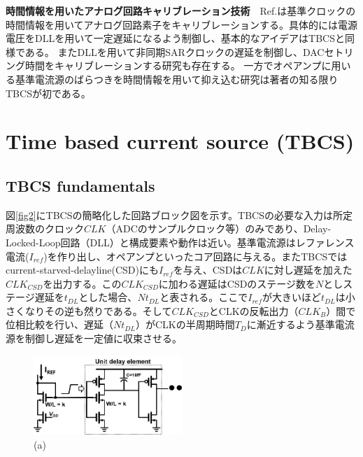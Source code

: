 \documentclass[letterpaper, 10 pt, conference]{ieeeconf}  %
\begin{document}
\textbf{時間情報を用いたアナログ回路キャリブレーション技術}　Ref.\cite{zhu}は基準クロックの時間情報を用いてアナログ回路素子をキャリブレーションする。具体的には電源電圧をDLLを用いて一定遅延になるよう制御し、基本的なアイデアはTBCSと同様である。
またDLLを用いて非同期SARクロックの遅延を制御し、DACセトリング時間をキャリブレーションする研究も存在する\cite{kapusta201314b,tompson}。
一方でオペアンプに用いる基準電流源のばらつきを時間情報を用いて抑え込む研究は著者の知る限りTBCSが初である。

\section{Time based current source (TBCS)}
\subsection{TBCS fundamentals}

図\ref{fig2}にTBCSの簡略化した回路ブロック図を示す。TBCSの必要な入力は所定周波数のクロック$CLK$（ADCのサンプルクロック等）のみであり、Delay-Locked-Loop回路（DLL）と構成要素や動作は近い\cite{sidiropoulos1997semidigital, lee19942, razavi2018delay}。基準電流源はレファレンス電流($I_{ref}$)を作り出し、オペアンプといったコア回路に与える。またTBCSではcurrent-starved-delayline(CSD)にも$I_{ref}$を与え、CSDは$CLK$に対し遅延を加えた$CLK_{CSD}$を出力する。この$CLK_{CSD}$に加わる遅延はCSDのステージ数を$N$としステージ遅延を$t_{DL}$とした場合、$Nt_{DL}$と表される。ここで$I_{ref}$が大きいほど$t_{DL}$は小さくなりその逆も然りである。そして$CLK_{CSD}$とCLKの反転出力（$CLK_B$）間で位相比較を行い、遅延（$Nt_{DL}$）がCLKの半周期時間$T_D$に漸近するよう基準電流源を制御し遅延を一定値に収束させる。


\begin{figure}[!]
\centering
 \includegraphics[width=0.5\textwidth]{figs/inv.png}
  \caption{(a) 
}
\label{inv}
\end{figure}
\end{document}
